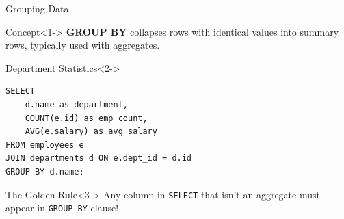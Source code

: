 \documentclass[aspectratio=169,11pt]{beamer}
\begin{document}
\begin{frame}[fragile]{Grouping Data}
\begin{block}{Concept}<1->
\textbf{GROUP BY} collapses rows with identical values into summary rows, typically used with aggregates.
\end{block}

\pause
\begin{exampleblock}{Department Statistics}<2->
\begin{lstlisting}
SELECT
    d.name as department,
    COUNT(e.id) as emp_count,
    AVG(e.salary) as avg_salary
FROM employees e
JOIN departments d ON e.dept_id = d.id
GROUP BY d.name;
\end{lstlisting}
\end{exampleblock}

\pause
\begin{alertblock}{The Golden Rule}<3->
Any column in \texttt{SELECT} that isn't an aggregate must appear in \texttt{GROUP BY} clause!
\end{alertblock}
\end{frame}
\end{document}
